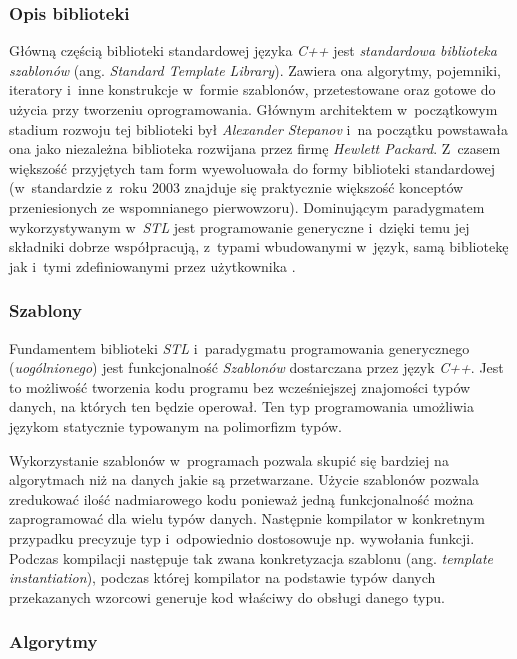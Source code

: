       \subsubsection{Opis biblioteki}

        Główną częścią biblioteki standardowej języka \textit{C++} jest \textit{standardowa biblioteka szablonów} (ang. \textit{Standard Template Library}). Zawiera ona algorytmy, pojemniki, iteratory i~inne konstrukcje w~formie szablonów, przetestowane oraz gotowe do użycia przy tworzeniu oprogramowania. Głównym architektem w~początkowym stadium rozwoju tej biblioteki był \textit{Alexander Stepanov} i~na początku powstawała ona jako niezależna biblioteka rozwijana przez firmę \textit{Hewlett Packard}. Z~czasem większość przyjętych tam form wyewoluowała do formy biblioteki standardowej (w~standardzie z~roku 2003 znajduje się praktycznie większość konceptów przeniesionych ze wspomnianego pierwowzoru). Dominującym paradygmatem wykorzystywanym w~\textit{STL} jest programowanie generyczne i~dzięki temu jej składniki dobrze współpracują, z~typami wbudowanymi w~język, samą bibliotekę jak i~tymi zdefiniowanymi przez użytkownika \cite{StlJosuttis}.

      \subsubsection{Szablony}

        Fundamentem biblioteki \textit{STL} i~paradygmatu programowania generycznego (\textit{uogólnionego}) jest funkcjonalność \textit{Szablonów} dostarczana przez język \textit{C++}. Jest to możliwość tworzenia kodu programu bez wcześniejszej znajomości typów danych, na których ten będzie operował. Ten typ programowania umożliwia językom statycznie typowanym na polimorfizm typów.

        Wykorzystanie szablonów w~programach pozwala skupić się bardziej na algorytmach niż na danych jakie są przetwarzane. Użycie szablonów pozwala zredukować ilość nadmiarowego kodu ponieważ jedną funkcjonalność można zaprogramować dla wielu typów danych. Następnie kompilator w konkretnym przypadku precyzuje typ i~odpowiednio dostosowuje np. wywołania funkcji. Podczas kompilacji następuje tak zwana konkretyzacja szablonu (ang. \textit{template instantiation}), podczas której kompilator na podstawie typów danych przekazanych wzorcowi generuje kod właściwy do obsługi danego typu.

      \subsubsection{Algorytmy}

